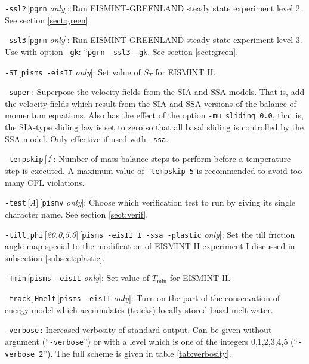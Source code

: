 \documentclass[11pt,final]{amsart}
\newcommand{\rawopt}[1]{\vspace{1mm}\noindent \large\texttt{-#1}\normalsize}
\newcommand{\opt}[1]{\rawopt{#1}\,:\quad}
\newcommand{\optdef}[2]{\rawopt{#1}\,[\textsl{#2}]:\quad}
\newcommand{\optrestrict}[2]{\rawopt{#1}\,[\texttt{#2} \textsl{only}]:\quad}
\newcommand{\optdefrestrict}[3]{\rawopt{#1}\,[\textsl{#2}]\,[\texttt{#3} \textsl{only}]:\quad}
\newcommand{\und}{$\underline{\,\,\,}$}
\begin{document}
\optrestrict{ssl2}{pgrn}    Run EISMINT-GREENLAND steady state experiment level 2. See section \ref{sect:green}.

\optrestrict{ssl3}{pgrn}    Run EISMINT-GREENLAND steady state experiment level 3.  Use with option \verb|-gk|: ``\verb|pgrn -ssl3 -gk|.  See section \ref{sect:green}.

\optrestrict{ST}{pisms -eisII}    Set value of $S_T$ for EISMINT II.

\opt{super}  Superpose the velocity fields from the SIA and SSA models.  That is, add the velocity fields which result from the SIA and SSA versions of the balance of momentum equations.  Also has the effect of the option \verb|-mu_sliding 0.0|, that is, the SIA-type sliding law is set to zero so that all basal sliding is controlled by the SSA model.  Only effective if used with \verb|-ssa|.

\optdef{tempskip}{1}  Number of mass-balance steps to perform before a temperature step is executed.  A maximum value of \verb|-tempskip 5| is recommended to avoid too many CFL violations.

\optdefrestrict{test}{A}{pismv}  Choose which verification test to run by giving its single character name.  See section \ref{sect:verif}.

\optdefrestrict{till\und phi}{20.0,5.0}{pisms -eisII I -ssa -plastic}  Set the till friction angle map special to the modification of EISMINT II experiment I discussed in subsection \ref{subsect:plastic}.

\optrestrict{Tmin}{pisms -eisII}    Set value of $T_{\text{min}}$ for EISMINT II.

\optrestrict{track\und Hmelt}{pisms -eisII}    Turn on the part of the conservation of energy model which accumulates (tracks) locally-stored basal melt water.

\opt{verbose}   Increased verbosity of standard output.  Can be given without argument (``\verb|-verbose|'') or with a level which is one of the integers 0,1,2,3,4,5 (``\verb|-verbose 2|'').  The full scheme is given in table \ref{tab:verbosity}.
\end{document}
